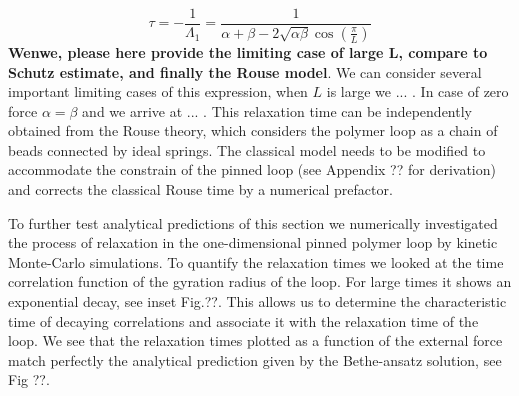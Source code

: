 \documentclass[aps,showpacs,twocolumn,floatfix,prx,superscriptaddress]{revtex4-1}
\begin{document}
\begin{equation}
    \label{eq:relaxationTime}
    \tau = -\frac{1}{\Lambda_1} = \frac{1}{\alpha+\beta-2\sqrt{\alpha\beta}\cos(\frac{\pi}{L})}
\end{equation}
{\bf Wenwe, please here provide the limiting case of large L, compare to Schutz estimate, and finally the Rouse model}. We can consider several important limiting cases of this expression, when $L$ is large we ... . In case of zero force $\alpha=\beta$ and we arrive at ... . This relaxation time can be independently obtained from the Rouse theory, which considers the polymer loop as a chain of beads connected by ideal springs. The classical model \cite{} needs to be modified to accommodate the constrain of the pinned loop (see Appendix ?? for derivation) and corrects the classical Rouse time by a numerical prefactor.

To further test analytical predictions of this section we numerically investigated the process of relaxation in the one-dimensional pinned polymer loop by kinetic Monte-Carlo simulations. To quantify the relaxation times we looked at the time correlation function of the gyration radius of the loop. For large times it shows an exponential decay, see inset Fig.??. This allows us to determine the characteristic time of decaying correlations and associate it with the relaxation time of the loop. We see that the relaxation times plotted as a function of the external force match perfectly the analytical prediction given by the Bethe-ansatz solution, see Fig ??.





%
%
%
%
%
%
%
\end{document}
